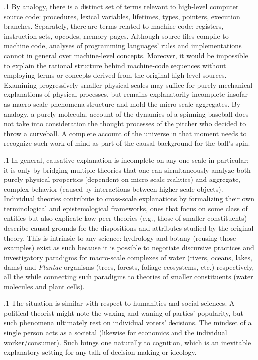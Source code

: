 \documentclass[11pt, twocolumn]{article}
\begin{document}
\p.1{%
By analogy, there is a distinct set of terms relevant to
high-level computer source code: procedures, lexical variables,
lifetimes, types, pointers, execution branches.  Separately,
there are terms related to machine code: registers, instruction
sets, opcodes, memory pages.  Although source files compile
to machine code, analyses of programming languages' rules and
implementations cannot in general  over machine-level
concepts.  Moreover, it would be impossible to explain the rational
structure behind machine-code sequences without employing terms
or concepts derived from the original high-level sources.  Examining progressively smaller
physical scales may suffice for purely mechanical explanations of
physical processes, but remains explanatorily incomplete insofar
as macro-scale phenomena structure and mold the micro-scale aggregates.
By analogy, a purely molecular account of the dynamics of a spinning
baseball does not take into consideration the thought processes
of the pitcher who decided to throw a curveball.  A complete
account of the universe in that moment needs to recognize such
work of mind as part of the causal background for the ball's spin.
} %

\p.1{%
In general, causative explanation is incomplete on any one scale in
particular; it is only by bridging multiple theories that one can
simultaneously analyze both purely physical properties (dependent
on micro-scale realities) and aggregate, complex behavior
(caused by interactions between higher-scale objects).  Individual
theories contribute to cross-scale explanations by formalizing
their own terminological and epistemological frameworks, ones
that focus on some class of entities but also explicate how
peer theories (e.g., those of smaller constituents) describe
causal grounds for the dispositions and attributes studied by
the original theory.  This is intrinsic to any science: hydrology
and botany (reusing those examples) exist as such because it
is possible to negotiate discursive practices and investigatory paradigms
for macro-scale complexes of water (rivers, oceans, lakes, dams)
and \textit{Plantae} organisms (trees, forests, foliage ecosystems, etc.) respectively, all the
while connecting such paradigms to theories of smaller constituents
(water molecules and plant cells).
} %

\p.1{%
The situation is similar with respect to humanities and social sciences.
A political theorist might note the waxing and waning of parties' popularity,
but such phenomena ultimately rest on individual voters' decisions.
The mindset of a single person acts as a societal 
(likewise for economics and the individual worker/consumer).  Such brings
one naturally to cognition, which is an inevitable explanatory
setting for any talk of decision-making or ideology.
} %
\end{document}

